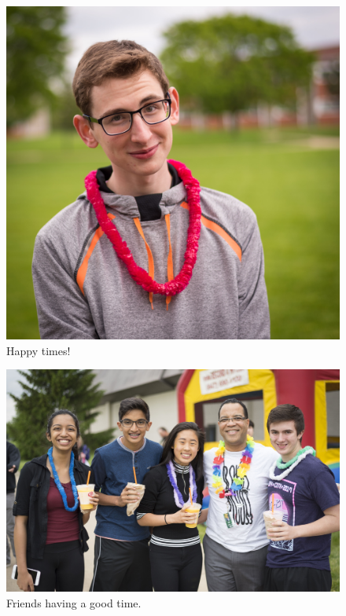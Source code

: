 \documentclass{report}
\begin{document}
\begin{figure}
  \includegraphics[width=\linewidth]{res/portraitlei.jpg}
  \caption{Happy times!}
\end{figure}

\begin{figure}
  \includegraphics[width=\linewidth]{res/groupluau.jpg}
  \caption{Friends having a good time.}
\end{figure}
\end{document}
